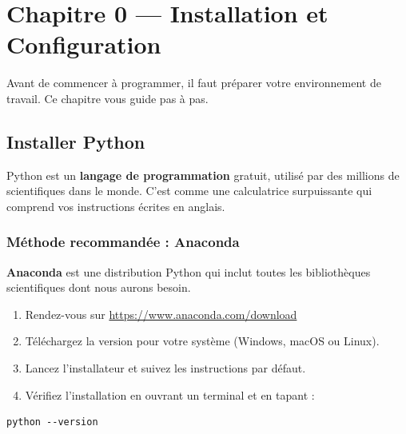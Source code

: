 \chapter*{Chapitre 0 --- Installation et Configuration}
\label{ch:installation}

Avant de commencer \`a programmer, il faut pr\'eparer votre environnement de travail. Ce chapitre vous guide pas \`a pas.

\section*{Installer Python}

\begin{intuition}
Python est un \textbf{langage de programmation} gratuit, utilis\'e par des millions de scientifiques dans le monde. C'est comme une calculatrice surpuissante qui comprend vos instructions \'ecrites en anglais.
\end{intuition}

\subsection*{M\'ethode recommand\'ee : Anaconda}

\textbf{Anaconda} est une distribution Python qui inclut toutes les biblioth\`eques scientifiques dont nous aurons besoin.

\begin{enumerate}
\item Rendez-vous sur \url{https://www.anaconda.com/download}
\item T\'el\'echargez la version pour votre syst\`eme (Windows, macOS ou Linux).
\item Lancez l'installateur et suivez les instructions par d\'efaut.
\item V\'erifiez l'installation en ouvrant un terminal et en tapant :
\end{enumerate}

\begin{codeblock}[title=\textbf{Terminal}]
\begin{verbatim}
python --version
\end{verbatim}
\end{codeblock}

